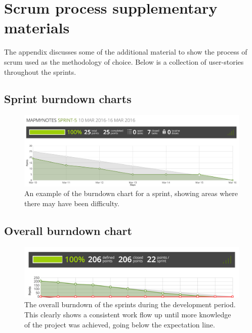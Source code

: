 \chapter{Scrum process supplementary materials} \label{appendix:scrum}
The appendix discusses some of the additional material to show the process of scrum used as the methodology of choice.
Below is a collection of user-stories throughout the sprints.
\section{Sprint burndown charts}
\begin{figure}[H]
  \centering
  \includegraphics[scale=0.35]{images/sprint-5-burndown-chart}
  \caption{An example of the burndown chart for a sprint, showing areas where there may have been difficulty.}
  \label{fig:sprint-burndown}

\end{figure}

\section{Overall burndown chart}
\begin{figure}[H]
  \centering
  \includegraphics[scale=0.5]{images/overall-burndown}
  \caption{The overall burndown of the sprints during the development period. This clearly shows a consistent work flow up until more knowledge of the project was achieved, going below the expectation line.}
  \label{fig:overall_burndown}
\end{figure}

